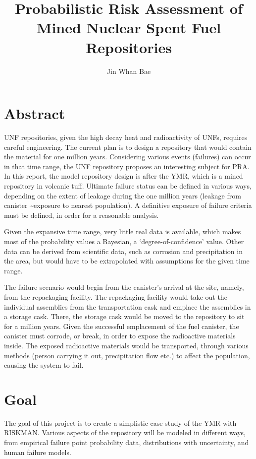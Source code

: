 \documentclass[12pt]{article}
\title{Probabilistic Risk Assessment of Mined Nuclear Spent Fuel Repositories }
\author{Jin Whan Bae}
\affil{Dept. of Nuclear, Plasma, and Radiological Engineering, University of Illinois at Urbana-Champaign
		  Urbana, IL}
\date{}                     %
\begin{document}
\maketitle

\section{Abstract}
\gls{UNF} repositories, given the high decay heat and radioactivity
of \glspl{UNF}, requires careful engineering. The current plan is
to design a repository that would contain the material for one million years.
Considering various events (failures) can occur in that time range,
the \gls{UNF} repository proposes an interesting subject for
\gls{PRA}. In this report, the model repository design is after the 
\gls{YMR}, which is a mined repository in volcanic tuff.
Ultimate failure status can be defined in various ways, depending on the
extent of leakage during the one million years (leakage from canister
\textasciitilde exposure to nearest population).
A definitive exposure of failure criteria must be defined,
in order for a reasonable analysis.  

Given the expansive
time range, very little real data is available, which makes
most of the probability values a Bayesian, a `degree-of-confidence' value.
Other data can be derived from scientific data, such as 
corrosion and precipitation in the area, but would have to be extrapolated
with assumptions for the given time range.

The failure scenario would begin from the canister's arrival at the
site, namely, from the repackaging facility. The repackaging facility
would take out the individual assemblies from the transportation cask
and emplace the assemblies in a storage cask. There, the storage cask
would be moved to the repository to sit for a million years. 
Given the successful emplacement of the fuel canister, the canister
must corrode, or break, in order to expose the radioactive materials
inside. The exposed radioactive materials would be transported, through
various methods (person carrying it out, precipitation flow etc.)
to affect the population, causing the system to fail.


\section{Goal}
The goal of this project is to create a simplistic case study of the
\gls{YMR} with RISKMAN. Various aspects of the repository
will be modeled in different ways, from empirical failure point probability data,
distributions with uncertainty, and human failure models.
\end{document}
